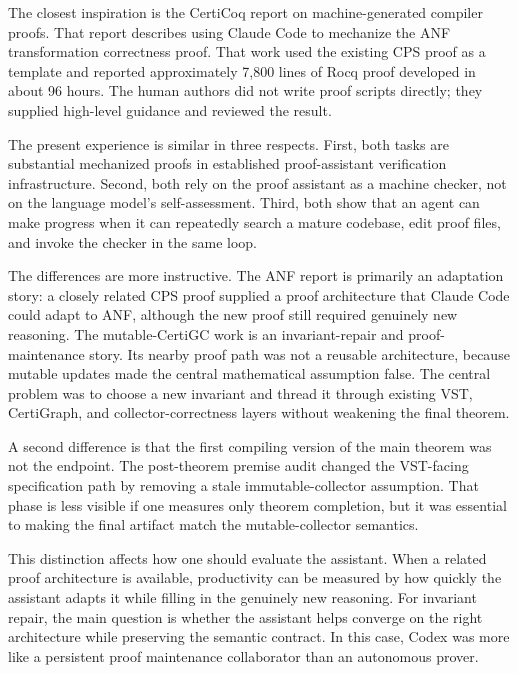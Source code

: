 \documentclass[acmsmall,nonacm]{acmart}
\newcommand{\Rocq}{Rocq}
\newcommand{\CertiGC}{CertiGC}
\newcommand{\CertiGraph}{CertiGraph}
\newcommand{\VST}{VST}
\begin{document}
The closest inspiration is the CertiCoq report on machine-generated compiler
proofs.  That report \citep{paraskevopoulou2026machinegenerated} describes
using Claude Code to mechanize the ANF transformation correctness proof.  That work
used the existing CPS proof as a template and reported approximately 7,800 lines
of \Rocq{} proof developed in about 96 hours.  The human authors did not write
proof scripts directly; they supplied high-level guidance and reviewed the
result.

The present experience is similar in three respects.  First, both tasks are
substantial mechanized proofs in established proof-assistant verification
infrastructure.
Second, both rely on the proof assistant as a machine checker, not on the
language model's self-assessment.  Third, both show that an agent can make
progress when it can repeatedly search a mature codebase, edit proof files, and
invoke the checker in the same loop.

The differences are more instructive.  The ANF report is primarily an
adaptation story: a closely related CPS proof supplied a proof architecture that
Claude Code could adapt to ANF, although the new proof still required genuinely
new reasoning.  The mutable-\CertiGC{} work is an invariant-repair and
proof-maintenance story.  Its nearby proof path was not a reusable architecture,
because mutable updates made the central mathematical assumption false.  The
central problem was to choose a new invariant and thread it through existing
\VST{}, \CertiGraph{}, and collector-correctness layers without weakening the
final theorem.

A second difference is that the first compiling version of the main theorem was
not the endpoint.  The post-theorem premise audit changed the
\VST{}-facing specification path by removing a stale immutable-collector
assumption.  That phase is less visible if one measures only theorem completion,
but it was essential to making the final artifact match the mutable-collector
semantics.

This distinction affects how one should evaluate the assistant.  When a related
proof architecture is available, productivity can be measured by how quickly the
assistant adapts it while filling in the genuinely new reasoning.  For invariant
repair, the main question is whether the assistant helps converge on the right
architecture while preserving the semantic contract.  In this case, Codex was
more like a persistent proof maintenance collaborator than an autonomous prover.
\end{document}
